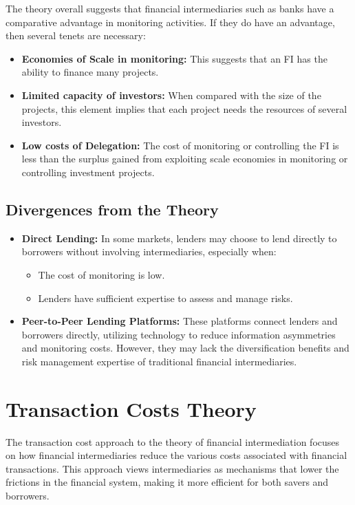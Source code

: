 The theory overall suggests that financial intermediaries such as banks have a comparative advantage in monitoring activities. If they do have an advantage, then several tenets are necessary:
\begin{itemize}
    \item \textbf{Economies of Scale in monitoring:} This suggests that an FI has the ability to finance many projects.
    \item \textbf{Limited capacity of investors:} When compared with the size of the projects, this element implies that each project needs the resources of several investors.
    \item \textbf{Low costs of Delegation:} The cost of monitoring or controlling the FI is less than the surplus gained from exploiting scale economies in monitoring or controlling investment projects.
\end{itemize}

\subsection*{Divergences from the Theory}
\begin{itemize}
    \item \textbf{Direct Lending:} In some markets, lenders may choose to lend directly to borrowers without involving intermediaries, especially when:
        \begin{itemize}
            \item The cost of monitoring is low.
            \item Lenders have sufficient expertise to assess and manage risks.
        \end{itemize}
    \item \textbf{Peer-to-Peer Lending Platforms:} These platforms connect lenders and borrowers directly, utilizing technology to reduce information asymmetries and monitoring costs. However, they may lack the diversification benefits and risk management expertise of traditional financial intermediaries.
\end{itemize}

\section{Transaction Costs Theory}

The transaction cost approach to the theory of financial intermediation focuses on how financial intermediaries reduce the various costs associated with financial transactions. This approach views intermediaries as mechanisms that lower the frictions in the financial system, making it more efficient for both savers and borrowers.

